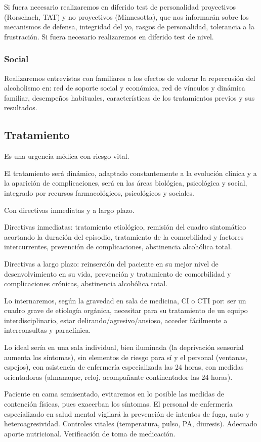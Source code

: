 \documentclass{scrbook}
\begin{document}
Si fuera necesario realizaremos en diferido test de personalidad proyectivos (Rorschach, TAT) y no proyectivos (Minnesotta), que nos informarán sobre los mecanismos de defensa, integridad del yo, rasgos de personalidad, tolerancia a la frustración. Si fuera necesario realizaremos en diferido test de nivel.
\subsubsection*{Social}
Realizaremos entrevistas con familiares a los efectos de valorar la repercusión del alcoholismo en: red de soporte social y económica, red de vínculos y dinámica familiar, desempeños habituales, características de los tratamientos previos y sus resultados.
\subsection*{Tratamiento}
Es una urgencia médica con riesgo vital.

El tratamiento será dinámico, adaptado constantemente a la evolución clínica y a la aparición de complicaciones, será en las áreas biológica, psicológica y social, integrado por recursos farmacológicos, psicológicos y sociales.

Con directivas inmediatas y a largo plazo.

Directivas inmediatas: tratamiento etiológico, remisión del cuadro sintomático acortando la duración del episodio, tratamiento de la comorbilidad y factores intercurrentes, prevención de complicaciones, abstinencia alcohólica total.

Directivas a largo plazo: reinserción del paciente en su mejor nivel de desenvolvimiento en su vida, prevención y tratamiento de comorbilidad y complicaciones crónicas, abstinencia alcohólica total.

Lo internaremos, según la gravedad en sala de medicina, CI o CTI por: ser un cuadro grave de etiología orgánica, necesitar para su tratamiento de un equipo interdisciplinario, estar delirando/agresivo/ansioso, acceder fácilmente a interconsultas y paraclínica.

Lo ideal sería en una sala individual, bien iluminada (la deprivación sensorial aumenta los síntomas), sin elementos de riesgo para sí y el personal (ventanas, espejos), con asistencia de enfermería especializada las 24 horas, con medidas orientadoras (almanaque, reloj, acompañante continentador las 24 horas).

Paciente en cama semisentado, evitaremos en lo posible las medidas de contención físicas, pues exacerban los síntomas. El personal de enfermería especializado en salud mental vigilará la prevención de intentos de fuga, auto y heteroagresividad. Controles vitales (temperatura, pulso, PA, diuresis). Adecuado aporte nutricional. Verificación de toma de medicación.
\end{document}
